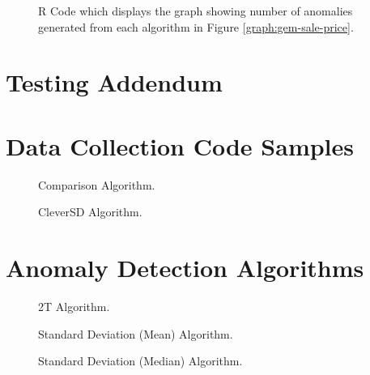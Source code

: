 \documentclass[journal]{IEEEtran}
\begin{document}
\begin{appendices}
    
    \begin{figure}[hbt!]
        \caption{R Code which displays the graph showing number of anomalies generated from each algorithm in Figure \ref{graph:gem-sale-price}.}
        \label{algorithm:r-gem-sale-price}
    \end{figure}

    \section{Testing Addendum}
    \label{appendix:testing-addendum}

    \section{Data Collection Code Samples}
    \label{appendix:collection-code}
    
    
    \begin{figure}[hbt!]
        \caption{Comparison Algorithm.}
        \label{algorithm:algorithm-comparison}
    \end{figure}

    
    \begin{figure}[hbt!]
        \caption{CleverSD Algorithm.}
        \label{algorithm:clever-sd}
    \end{figure}

    \section{Anomaly Detection Algorithms}
    \label{appendix:detection-code}
    
    
    \begin{figure}[hbt!]
        \caption{2T Algorithm.}
        \label{algorithm:2t}
    \end{figure}
    
    
    \begin{figure}[hbt!]
        \caption{Standard Deviation (Mean) Algorithm.}
        \label{algorithm:sd-mean}
    \end{figure}
    
    
    \begin{figure}[hbt!]
        \caption{Standard Deviation (Median) Algorithm.}
        \label{algorithm:sd-median}
    \end{figure}


\end{appendices}
\end{document}
